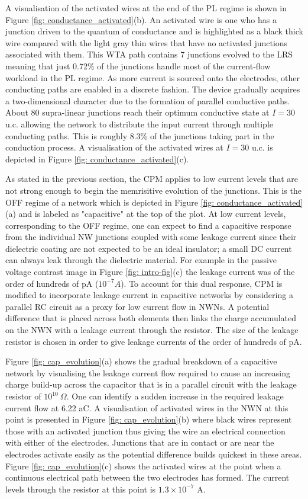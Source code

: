 A visualisation of the activated wires at the end of the PL regime is shown in Figure \ref{fig: conductance_activated}(b). An activated wire is one who has a junction driven to the quantum of conductance and is highlighted as a black thick wire compared with the light gray thin wires that have no activated junctions associated with them. This WTA path contains 7 junctions evolved to the LRS meaning that just 0.72\% of the junctions handle most of the current-flow workload in the PL regime. As more current is sourced onto the electrodes, other conducting paths are enabled in a discrete fashion. The device gradually acquires a two-dimensional character due to the formation of parallel conductive paths. About 80 supra-linear junctions reach their optimum conductive state at $I=30$ u.c. allowing the network to distribute the input current through multiple conducting paths. This is roughly 8.3\% of the junctions taking part in the conduction process. A visualisation of the activated wires at $I = 30$ u.c. is depicted in Figure \ref{fig: conductance_activated}(c).

As stated in the previous section, the CPM applies to low current levels that are not strong enough to begin the memrisitive evolution of the junctions. This is the OFF regime of a network which is depicted in Figure \ref{fig: conductance_activated}(a) and is labeled as "capacitive" at the top of the plot. At low current levels, corresponding to the OFF regime, one can expect to find a capacitive response from the individual NW junctions coupled with some leakage current since their dielectric coating are not expected to be an ideal insulator; a small DC current can always leak through the dielectric material. For example in the passive voltage contrast image in Figure \ref{fig: intro-fig}(c) the leakage current was of the order of hundreds of pA ($10^{-7}A$)\cite{ocallaco2018}.  To account for this dual response, CPM is modified to incorporate leakage current in capacitive networks by considering a parallel RC circuit as a proxy for low current flow in NWNs. A potential difference that is placed across both elements then links the charge accumulated on the NWN with a leakage current through the resistor. The size of the leakage resistor is chosen in order to give leakage currents of the order of hundreds of pA.

Figure \ref{fig: cap_evolution}(a) shows the gradual breakdown of a capacitive network by visualising the leakage current flow required to cause an increasing charge build-up across the capacitor that is in a parallel circuit with the leakage resistor of $10^{10} ~\Omega$. One can identify a sudden increase in the required leakage current flow at 6.22 aC. A visualisation of activated wires in the NWN at this point is presented in Figure \ref{fig: cap_evolution}(b) where black wires represent those with an activated junction thus giving the wire an electrical connection with either of the electrodes. Junctions that are in contact or are near the electrodes activate easily as the potential difference builds quickest in these areas. Figure \ref{fig: cap_evolution}(c) shows the activated wires at the point when a continuous electrical path between the two electrodes has formed. The current levels through the resistor at this point is $1.3 \times 10^{-7}$ A. 

